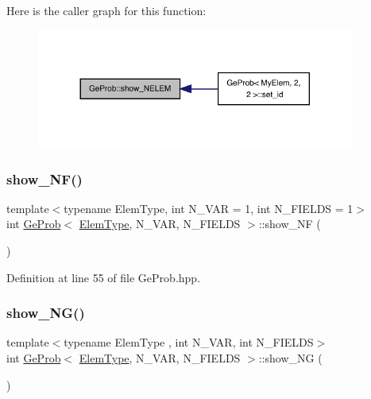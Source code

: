 Here is the caller graph for this function\+:
\nopagebreak
\begin{figure}[H]
\begin{center}
\leavevmode
\includegraphics[width=296pt]{classGeProb_aa9c2c6d251e061c3cf58806097c55f04_icgraph}
\end{center}
\end{figure}
\mbox{\label{classGeProb_ac7f36c8a5ae46b8ddc8cdd8db059e9cc}} 
\subsubsection{\texorpdfstring{show\+\_\+\+N\+F()}{show\_NF()}}
{\footnotesize\ttfamily template$<$typename Elem\+Type, int N\+\_\+\+V\+AR = 1, int N\+\_\+\+F\+I\+E\+L\+DS = 1$>$ \\
int \hyperlink{classGeProb}{Ge\+Prob}$<$ \hyperlink{spectral_8h_aaa2c1a7b2d1b12c590d730fe6ac839fa}{Elem\+Type}, N\+\_\+\+V\+AR, N\+\_\+\+F\+I\+E\+L\+DS $>$\+::show\+\_\+\+NF (\begin{DoxyParamCaption}{ }\end{DoxyParamCaption})\hspace{0.3cm}{\ttfamily [inline]}}



Definition at line 55 of file Ge\+Prob.\+hpp.

\mbox{\label{classGeProb_a2f37b74c21a3bdc3fc112babc8a0123b}} 
\subsubsection{\texorpdfstring{show\+\_\+\+N\+G()}{show\_NG()}}
{\footnotesize\ttfamily template$<$typename Elem\+Type , int N\+\_\+\+V\+AR, int N\+\_\+\+F\+I\+E\+L\+DS$>$ \\
int \hyperlink{classGeProb}{Ge\+Prob}$<$ \hyperlink{spectral_8h_aaa2c1a7b2d1b12c590d730fe6ac839fa}{Elem\+Type}, N\+\_\+\+V\+AR, N\+\_\+\+F\+I\+E\+L\+DS $>$\+::show\+\_\+\+NG (\begin{DoxyParamCaption}{ }\end{DoxyParamCaption})}



